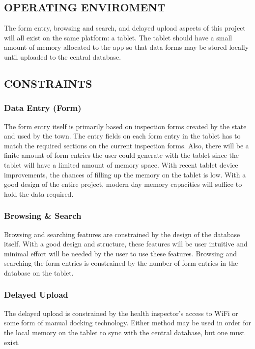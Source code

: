 \documentclass[twoside,letterpaper]{article}
\begin{document}
\subsection[OPERATING ENVIRONMENT]{\rmfamily\bfseries\color{black}
OPERATING ENVIROMENT}
{\rmfamily\color{black}
The form entry, browsing and search, and delayed upload aspects of this project will all exist on the same platform: a tablet. The tablet should have a small amount of memory allocated to the app so that data forms may be stored locally until uploaded to the central database.}



\subsection[CONSTRAINTS]{\rmfamily\bfseries\color{black}
CONSTRAINTS}
\subsubsection{Data Entry (Form)}
{\color{black}
The form entry itself is primarily based on inspection forms created by the state and used by the town. The entry fields on each form entry in the tablet has to match the required sections on the current inspection forms. Also, there will be a finite amount of form entries the user could generate with the tablet since the tablet will have a limited amount of memory space. With recent tablet device improvements, the chances of filling up the memory on the tablet is low. With a good design of the entire project, modern day memory capacities will suffice to hold the data required.}

\subsubsection{Browsing \& Search}
{\color{black}
Browsing and searching features are constrained by the design of the database itself. With a good design and structure, these features will be user intuitive and minimal effort will be needed by the user to use these features. Browsing and searching the form entries is constrained by the number of form entries in the database on the tablet.}

\subsubsection{Delayed Upload}
{\color{black}
The delayed upload is constrained by the health inspector's access to WiFi or some form of manual docking technology. Either method may be used in order for the local memory on the tablet to sync with the central database, but one must exist.}
\end{document}
